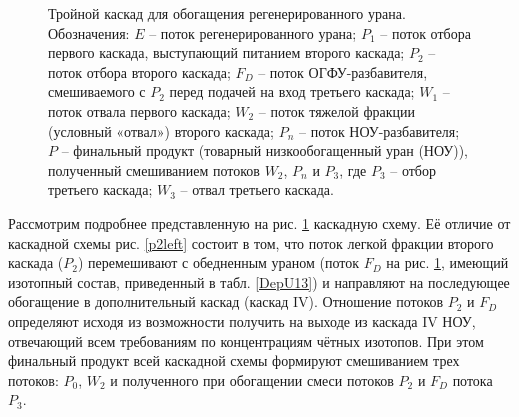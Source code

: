 \begin{figure}[ht]
    \caption{Тройной каскад для обогащения регенерированного урана. Обозначения: $E$ -- поток регенерированного урана; $P_1$ -- поток отбора первого каскада, выступающий питанием второго каскада; $P_2$ -- поток отбора второго каскада; $F_{D}$ -- поток ОГФУ-разбавителя, смешиваемого с $P_2$ перед подачей на вход третьего каскада; $W_1$ -- поток отвала первого каскада; $W_2$ -- поток тяжелой фракции (условный «отвал») второго каскада; $P_n$ -- поток НОУ-разбавителя; $P$ -- финальный продукт (товарный низкообогащенный уран (НОУ)), полученный смешиванием потоков $W_2$, $P_n$ и $P_3$, где $P_3$ -- отбор третьего каскада; $W_3$ -- отвал третьего каскада.}\label{p2_withDepU}
\end{figure}

Рассмотрим подробнее представленную на рис. \ref{p2_withDepU} каскадную схему. Её отличие от каскадной схемы рис. \ref{p2left} состоит в том, что поток легкой фракции второго каскада ($P_2$) перемешивают с обедненным ураном (поток $F_{D}$ на рис. \ref{p2_withDepU}, имеющий изотопный состав, приведенный в табл. \ref{DepU13}) и направляют на последующее обогащение в дополнительный каскад (каскад IV). Отношение потоков $P_2$ и $F_{D}$ определяют исходя из возможности получить на выходе из каскада IV НОУ, отвечающий всем требованиям по концентрациям чётных изотопов. При этом финальный продукт всей каскадной схемы формируют смешиванием трех потоков: $P_0$, $W_2$ и полученного при обогащении смеси потоков $P_2$ и $F_{D}$ потока $P_3$.

